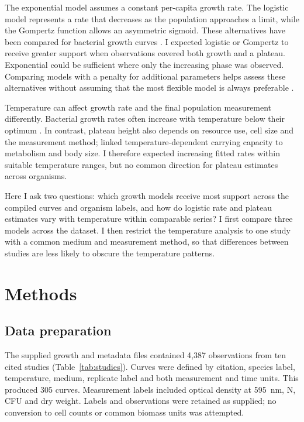 \documentclass[11pt,a4paper]{article}
\begin{document}
The exponential model assumes a constant per-capita growth rate. The logistic model represents a rate that decreases as the population approaches a limit, while the Gompertz function allows an asymmetric sigmoid. These alternatives have been compared for bacterial growth curves \citep{Zwietering1990}. I expected logistic or Gompertz to receive greater support when observations covered both growth and a plateau. Exponential could be sufficient where only the increasing phase was observed. Comparing models with a penalty for additional parameters helps assess these alternatives without assuming that the most flexible model is always preferable \citep{Johnson2004}.

Temperature can affect growth rate and the final population measurement differently. Bacterial growth rates often increase with temperature below their optimum \citep{Ratkowsky1982}. In contrast, plateau height also depends on resource use, cell size and the measurement method; \citet{Bernhardt2018} linked temperature-dependent carrying capacity to metabolism and body size. I therefore expected increasing fitted rates within suitable temperature ranges, but no common direction for plateau estimates across organisms.

Here I ask two questions: which growth models receive most support across the compiled curves and organism labels, and how do logistic rate and plateau estimates vary with temperature within comparable series? I first compare three models across the dataset. I then restrict the temperature analysis to one study with a common medium and measurement method, so that differences between studies are less likely to obscure the temperature patterns.

\section{Methods}
\subsection{Data preparation}
The supplied growth and metadata files contained 4,387 observations from ten cited studies (Table~\ref{tab:studies}). Curves were defined by citation, species label, temperature, medium, replicate label and both measurement and time units. This produced 305 curves. Measurement labels included optical density at 595~nm, N, CFU and dry weight. Labels and observations were retained as supplied; no conversion to cell counts or common biomass units was attempted.
\end{document}
